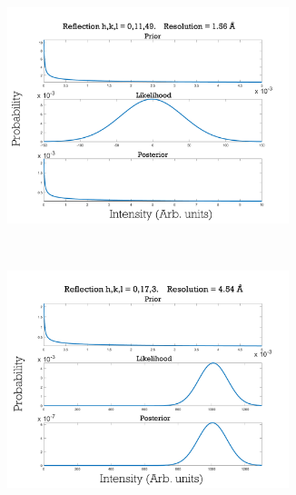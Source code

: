 \begin{figure}
        \centering
        \begin{subfigure}[b]{0.94\textwidth}
                \centering
                \includegraphics[width=0.9\textwidth]{figures/zde/distributions_0,11,49.pdf}
                \caption{}
                \label{fig:Weak negative reflection intensity - Extrapolation method}
        \end{subfigure}
				\\
        \begin{subfigure}[b]{0.94\textwidth}
                \centering
                \includegraphics[width=0.9\textwidth]{figures/zde/distributions_0,17,3.pdf}
                \caption{}
                \label{fig:Strong positive reflection intensity - Extrapolation method}
        \end{subfigure}

\end{figure}
